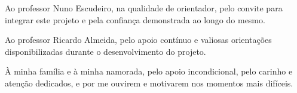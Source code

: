 

\frontmatter %

%

\pagestyle{plain} %
\setcounter{secnumdepth}{3}


\maketitlepage










\begin{acknowledgements}

Ao professor Nuno Escudeiro, na qualidade de orientador, pelo convite para integrar este projeto e pela confiança demonstrada ao longo do mesmo.

Ao professor Ricardo Almeida, pelo apoio contínuo e valiosas orientações disponibilizadas durante o desenvolvimento do projeto.

À minha família e à minha namorada, pelo apoio incondicional, pelo carinho e atenção dedicados, e por me ouvirem e motivarem nos momentos mais difíceis.

\end{acknowledgements}

